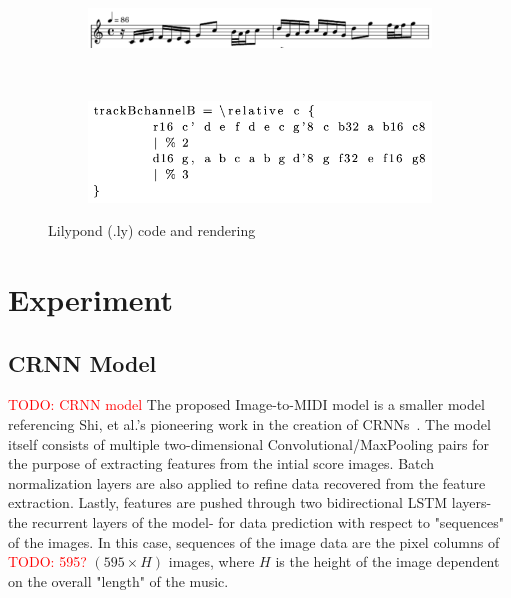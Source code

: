 \documentclass[review,sigconf]{acmart}
\newcommand{\todo}[1]{\textcolor{red}{TODO: #1}}
\begin{document}
\begin{figure}
	\begin{subfigure}
		\centering
		\includegraphics[width = .8\linewidth]{./figures/lilypond-snippet.png}
	\end{subfigure}
	~
	\begin{subfigure}
		\centering
		\includegraphics[width = .8\linewidth]{./figures/lilypond-code.png}
	\end{subfigure}
	\caption{Lilypond (.ly) code and rendering}
	\label{fig:lilypond-example}
\end{figure}

\section{Experiment}

\subsection{CRNN Model}
\todo{CRNN model}
The proposed Image-to-MIDI model is a smaller model referencing Shi, et al.'s pioneering work in the creation of CRNNs~\cite{shi2015endtoend}.
The model itself consists of multiple two-dimensional Convolutional/MaxPooling pairs for the purpose of extracting features from the intial score images.
Batch normalization layers are also applied to refine data recovered from the feature extraction.
Lastly, features are pushed through two bidirectional LSTM layers- the recurrent layers of the model- for data prediction with respect to "sequences" of the images.
In this case, sequences of the image data are the pixel columns of \todo{595?} $(595 \times H)$ images, where $H$ is the height of the image dependent on the overall "length" of the music.
\end{document}

